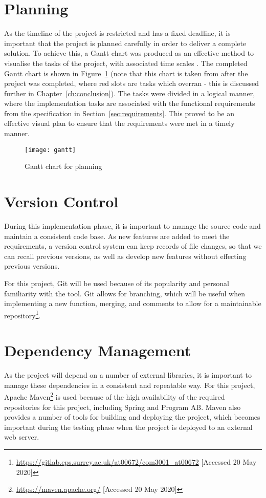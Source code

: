 \section{Planning}
As the timeline of the project is restricted and has a fixed deadline, it is important that the project is planned carefully in order to deliver a complete solution. To achieve this, a Gantt chart was produced as an effective method to visualise the tasks of the project, with associated time scales \cite{wilson2003gantt}. The completed Gantt chart is shown in Figure~\ref{fig:gantt} (note that this chart is taken from after the project was completed, where red slots are tasks which overran - this is discussed further in Chapter~\ref{ch:conclusion}). The tasks were divided in a logical manner, where the implementation tasks are associated with the functional requirements from the specification in Section~\ref{sec:requirements}. This proved to be an effective visual plan to ensure that the requirements were met in a timely manner.

\begin{landscape}
	\begin{figure}[h]
		\centering
		\texttt{[image: gantt]}
		\caption{Gantt chart for planning}
		\label{fig:gantt}
	\end{figure}
\end{landscape}

\section{Version Control}
During this implementation phase, it is important to manage the source code and maintain a consistent code base. As new features are added to meet the requirements, a version control system can keep records of file changes, so that we can recall previous versions, as well as develop new features without effecting previous versions.

For this project, Git will be used because of its popularity and personal familiarity with the tool. Git allows for branching, which will be useful when implementing a new function, merging, and comments to allow for a maintainable repository\footnote{\url{https://gitlab.eps.surrey.ac.uk/at00672/com3001_at00672} [Accessed 20 May 2020]}.

\section{Dependency Management}
As the project will depend on a number of external libraries, it is important to manage these dependencies in a consistent and repeatable way. For this project, Apache Maven\footnote{\url{https://maven.apache.org/} [Accessed 20 May 2020]} is used because of the high availability of the required repositories for this project, including Spring and Program AB. Maven also provides a number of tools for building and deploying the project, which becomes important during the testing phase when the project is deployed to an external web server.

